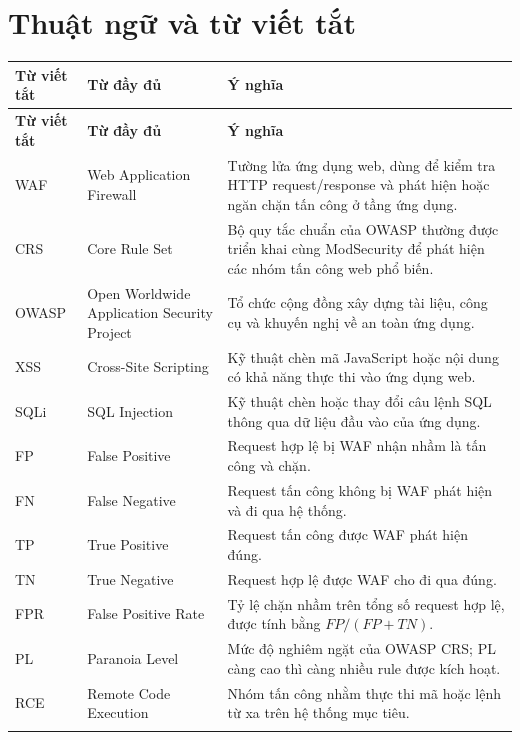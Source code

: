\chapter*{Thuật ngữ và từ viết tắt}

{\small
\renewcommand{\arraystretch}{1.2}
\begin{longtable}{|C{0.14\textwidth}|L{0.30\textwidth}|L{0.46\textwidth}|}
    \hline
    \textbf{Từ viết tắt} & \textbf{Từ đầy đủ} & \textbf{Ý nghĩa} \\
    \hline
    \endfirsthead

    \hline
    \textbf{Từ viết tắt} & \textbf{Từ đầy đủ} & \textbf{Ý nghĩa} \\
    \hline
    \endhead

    WAF & Web Application Firewall & Tường lửa ứng dụng web, dùng để kiểm tra HTTP request/response và phát hiện hoặc ngăn chặn tấn công ở tầng ứng dụng. \\
    \hline
    CRS & Core Rule Set & Bộ quy tắc chuẩn của OWASP thường được triển khai cùng ModSecurity để phát hiện các nhóm tấn công web phổ biến. \\
    \hline
    OWASP & Open Worldwide Application Security Project & Tổ chức cộng đồng xây dựng tài liệu, công cụ và khuyến nghị về an toàn ứng dụng. \\
    \hline
    XSS & Cross-Site Scripting & Kỹ thuật chèn mã JavaScript hoặc nội dung có khả năng thực thi vào ứng dụng web. \\
    \hline
    SQLi & SQL Injection & Kỹ thuật chèn hoặc thay đổi câu lệnh SQL thông qua dữ liệu đầu vào của ứng dụng. \\
    \hline
    FP & False Positive & Request hợp lệ bị WAF nhận nhầm là tấn công và chặn. \\
    \hline
    FN & False Negative & Request tấn công không bị WAF phát hiện và đi qua hệ thống. \\
    \hline
    TP & True Positive & Request tấn công được WAF phát hiện đúng. \\
    \hline
    TN & True Negative & Request hợp lệ được WAF cho đi qua đúng. \\
    \hline
    FPR & False Positive Rate & Tỷ lệ chặn nhầm trên tổng số request hợp lệ, được tính bằng $FP/(FP+TN)$. \\
    \hline
    PL & Paranoia Level & Mức độ nghiêm ngặt của OWASP CRS; PL càng cao thì càng nhiều rule được kích hoạt. \\
    \hline
    RCE & Remote Code Execution & Nhóm tấn công nhằm thực thi mã hoặc lệnh từ xa trên hệ thống mục tiêu. \\
    \hline
    \label{tab:terms}
\end{longtable}
}
